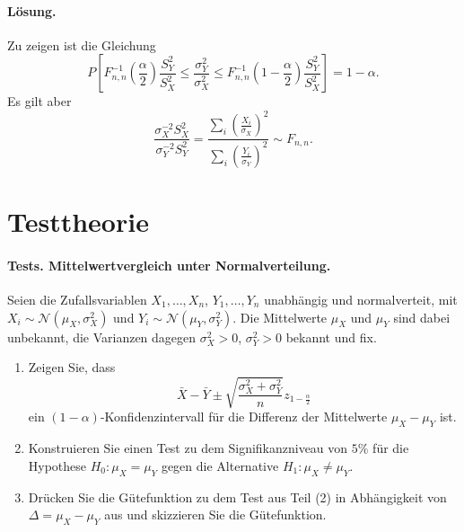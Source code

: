 \paragraph*{Lösung.} Zu zeigen ist die Gleichung
\begin{equation}
    P \left[ F^{-1}_{n,n} \left( \frac{\alpha}{2} \right) \frac{S_Y^2}{S_X^2} \leq 
    \frac{\sigma^2_Y}{\sigma^2_X} \leq
    F^{-1}_{n,n} \left( 1 - \frac{\alpha}{2}  \right) \frac{S_Y^2}{S_X^2}     \right]
    = 1-\alpha.
\end{equation}
Es gilt aber 
\begin{equation}
    \frac{\sigma^{-2}_X S^2_X  }{ \sigma^{-2}_Y S^2_Y} = 
    \frac{\sum_{i}^{} \left( \frac{X_i}{\sigma_X} \right)^2  }{ \sum_{i}^{} \left( \frac{Y_i}{\sigma_Y} \right)^2 } \sim F_{n,n}.
\end{equation}


\section{Testtheorie}

\paragraph{Tests. Mittelwertvergleich unter Normalverteilung. } 
Seien die Zufallsvariablen $X_1,\ldots,X_n$, $Y_1,\ldots,Y_n$ unabhängig und normalverteit, 
mit $X_i\sim\mathcal N(\mu_X, \sigma^2_X)$ und $Y_i\sim\mathcal N(\mu_Y, \sigma^2_Y)$.
Die Mittelwerte $\mu_X$ und $\mu_Y$ sind dabei unbekannt, die Varianzen dagegen
$\sigma_X^2>0$, $\sigma^2_Y>0$ bekannt und fix.
\begin{enumerate}
    \item Zeigen Sie, dass 
        \begin{equation}
            \bar X - \bar Y \pm \sqrt{ \frac{\sigma^2_X + \sigma^2_Y}{n}  }z_{1-\frac{\alpha}{2}}
        \end{equation}
        ein $(1-\alpha)$-Konfidenzintervall für die Differenz der Mittelwerte $\mu_X - \mu_Y$ ist.
    \item Konstruieren Sie einen Test zu dem Signifikanzniveau von $5\%$ für die Hypothese
        $H_0: \mu_X = \mu_Y$ gegen die Alternative $H_1: \mu_X \neq \mu_Y$.
    \item Drücken Sie die Gütefunktion zu dem Test aus Teil (2) in Abhängigkeit von
        $\Delta = \mu_X -\mu_Y$ aus und skizzieren Sie die Gütefunktion. 
\end{enumerate}

